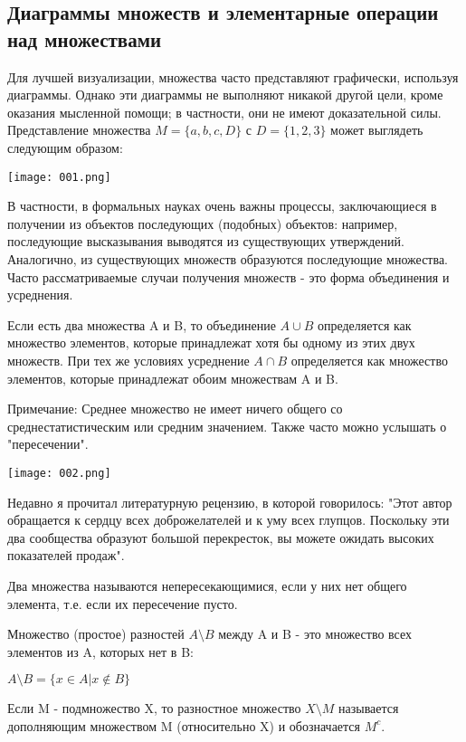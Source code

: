 \subsection{Диаграммы множеств и элементарные операции над множествами}
Для лучшей визуализации, множества часто представляют графически, используя диаграммы.
Однако эти диаграммы не выполняют никакой другой цели, кроме оказания мысленной помощи;
в частности, они не имеют доказательной силы. Представление множества \(M = \{a, b, c, D\}\) с \(D=\{1, 2, 3\}\) может выглядеть следующим образом:
\begin{center}
  \texttt{[image: 001.png]}
\end{center}
В частности, в формальных науках очень важны процессы, заключающиеся в получении из объектов последующих (подобных) объектов: например, последующие высказывания выводятся из существующих утверждений.
Аналогично, из существующих множеств образуются последующие множества.
Часто рассматриваемые случаи получения множеств - это форма объединения и усреднения.

Если есть два множества A и B, то объединение \(A \cup B\) определяется как множество элементов, которые принадлежат хотя бы одному из этих двух множеств.
При тех же условиях усреднение \(A \cap B\) определяется как множество элементов, которые принадлежат обоим множествам A и B.

Примечание: Среднее множество не имеет ничего общего со среднестатистическим или средним значением.
Также часто можно услышать о "пересечении".
\begin{center}
  \texttt{[image: 002.png]}
\end{center}
Недавно я прочитал литературную рецензию, в которой говорилось: "Этот автор обращается к сердцу всех доброжелателей и к уму всех глупцов.
Поскольку эти два сообщества образуют большой перекресток, вы можете ожидать высоких показателей продаж".

Два множества называются непересекающимися, если у них нет общего элемента, т.е. если их пересечение пусто.

Множество (простое) разностей \(A \setminus B\) между A и B - это множество всех элементов из A, которых нет в B:

\vspace{0.5cm}
\(A \setminus B = \{x \in A | x \notin B\}\)

\vspace{0.5cm}
Если M - подмножество X, то разностное множество \(X \setminus M\) называется дополняющим множеством M (относительно X) и обозначается \(M^c\).

